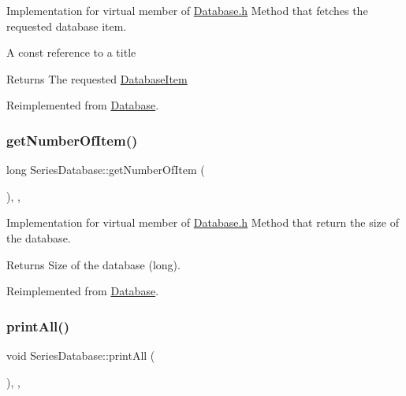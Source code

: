 Implementation for virtual member of \hyperlink{Database_8h_source}{Database.\+h} Method that fetches the requested database item. 

A const reference to a title

\begin{DoxyReturn}{Returns}
The requested \hyperlink{classDatabaseItem}{Database\+Item}
\end{DoxyReturn}


Reimplemented from \hyperlink{classDatabase_a40254eec69c7d7cc15da24a9f0b072b3}{Database}.

\mbox{\label{classSeriesDatabase_af5fe5a423303eff4489a7679907ef994}} 
\subsubsection{\texorpdfstring{get\+Number\+Of\+Item()}{getNumberOfItem()}}
{\footnotesize\ttfamily long Series\+Database\+::get\+Number\+Of\+Item (\begin{DoxyParamCaption}{ }\end{DoxyParamCaption})\hspace{0.3cm}{\ttfamily [inline]}, {\ttfamily [override]}, {\ttfamily [virtual]}}



Implementation for virtual member of \hyperlink{Database_8h_source}{Database.\+h} Method that return the size of the database. 

\begin{DoxyReturn}{Returns}
Size of the database (long).
\end{DoxyReturn}


Reimplemented from \hyperlink{classDatabase_a230225cb341eb23a99a83ef3d1abae53}{Database}.

\mbox{\label{classSeriesDatabase_ae2bf5323216e0043292494d3f0ac978c}} 
\subsubsection{\texorpdfstring{print\+All()}{printAll()}}
{\footnotesize\ttfamily void Series\+Database\+::print\+All (\begin{DoxyParamCaption}{ }\end{DoxyParamCaption})\hspace{0.3cm}{\ttfamily [inline]}, {\ttfamily [override]}, {\ttfamily [virtual]}}



